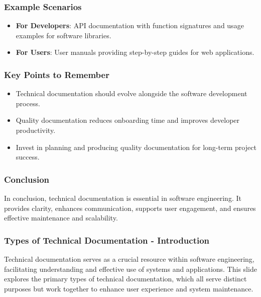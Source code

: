 \documentclass{beamer}
\begin{document}
\begin{frame}[fragile]
    \frametitle{Example Scenarios}
    \begin{itemize}
        \item \textbf{For Developers}: API documentation with function signatures and usage examples for software libraries.
        \item \textbf{For Users}: User manuals providing step-by-step guides for web applications.
    \end{itemize}
\end{frame}

\begin{frame}[fragile]
    \frametitle{Key Points to Remember}
    \begin{itemize}
        \item Technical documentation should evolve alongside the software development process.
        \item Quality documentation reduces onboarding time and improves developer productivity.
        \item Invest in planning and producing quality documentation for long-term project success.
    \end{itemize}
\end{frame}

\begin{frame}[fragile]
    \frametitle{Conclusion}
    In conclusion, technical documentation is essential in software engineering. It provides clarity, enhances communication, supports user engagement, and ensures effective maintenance and scalability.
\end{frame}

\begin{frame}[fragile]
    \frametitle{Types of Technical Documentation - Introduction}
    Technical documentation serves as a crucial resource within software engineering, facilitating understanding and effective use of systems and applications. This slide explores the primary types of technical documentation, which all serve distinct purposes but work together to enhance user experience and system maintenance.
\end{frame}
\end{document}
